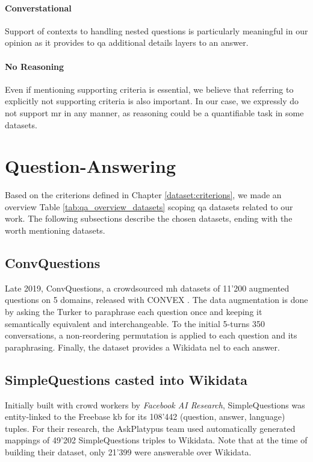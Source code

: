 \paragraph{Converstational}
Support of contexts to handling nested questions is particularly meaningful in our opinion as it provides to \gls{qa} additional details layers to an answer.

\paragraph{No Reasoning}
Even if mentioning supporting criteria is essential, we believe that referring to explicitly not supporting criteria is also important. In our case, we expressly do not support \gls{mr} in any manner, as reasoning could be a quantifiable task in some datasets.


\section{Question-Answering}
\label{dataset:qa}
Based on the criterions defined in Chapter \ref{dataset:criterions}, we made an overview Table \ref{tab:qa_overview_datasets} scoping \gls{qa} datasets related to our work. The following subsections describe the chosen datasets, ending with the worth mentioning datasets.

\subsection{ConvQuestions}
\label{dataset:convquestions}
Late 2019, ConvQuestions, a crowdsourced \gls{mh} datasets of 11'200 augmented questions on 5 domains, released with CONVEX \autocite{paper:convex}. The data augmentation is done by asking the Turker to paraphrase each question once and keeping it semantically equivalent and interchangeable. To the initial 5-turns 350 conversations, a non-reordering permutation is applied to each question and its paraphrasing. Finally, the dataset provides a Wikidata \gls{nel} to each answer.

\subsection{SimpleQuestions casted into Wikidata}
\label{dataset:simplequestions}
Initially built with crowd workers by \textit{Facebook AI Research}, SimpleQuestions\autocite{paper:journals/corr/BordesUCW15} was entity-linked to the Freebase \gls{kb} for its 108'442 (question, answer, language) tuples. For their research, the AskPlatypus \autocite{paper:wikidata-benchmark} team used automatically generated mappings of 49'202 SimpleQuestions triples to Wikidata. Note that at the time of building their dataset, only 21'399 were answerable over Wikidata.

